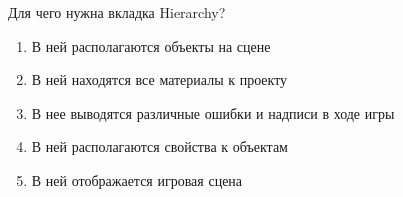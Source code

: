 
Для чего нужна вкладка Hierarchy?

\begin{enumerate}
    \item В ней располагаются объекты на сцене
    \item В ней находятся все материалы к проекту
    \item В нее выводятся различные ошибки и надписи в ходе игры
    \item В ней располагаются свойства к объектам
    \item В ней отображается игровая сцена
\end{enumerate}

